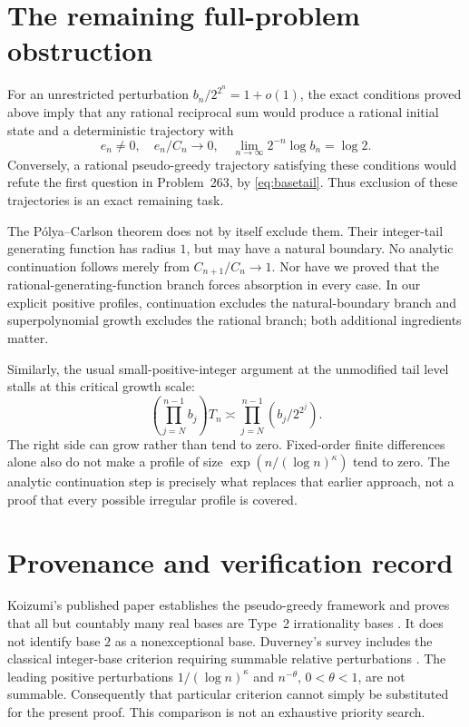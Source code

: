 \documentclass[11pt,a4paper]{article}
\theoremstyle{remark}\newtheorem{remark}[theorem]{Remark}
\begin{document}
\section{The remaining full-problem obstruction}
For an unrestricted perturbation $b_n/2^{2^n}=1+o(1)$, the exact conditions
proved above imply that any rational reciprocal sum would produce a
rational initial state and a deterministic trajectory with
\begin{equation}\label{eq:openbridge}
 \boxed{\qquad
 e_n\ne0,\quad e_n/C_n\longrightarrow0,\quad
 \lim_{n\to\infty}2^{-n}\log b_n=\log2.
 \qquad}
\end{equation}
Conversely, a rational pseudo-greedy trajectory satisfying these conditions
would refute the first question in Problem~263, by \eqref{eq:basetail}.
Thus exclusion of these trajectories is an exact remaining task.

The P\'olya--Carlson theorem does not by itself exclude them. Their
integer-tail generating function has radius $1$, but may have a natural
boundary. No analytic continuation follows merely from
$C_{n+1}/C_n\to1$. Nor have we proved that the rational-generating-function
branch forces absorption in every case. In our explicit positive profiles,
continuation excludes the natural-boundary branch and superpolynomial
growth excludes the rational branch; both additional ingredients matter.

Similarly, the usual small-positive-integer argument at the unmodified tail
level stalls at this critical growth scale:
\[
 \left(\prod_{j=N}^{n-1}b_j\right)T_n
 \asymp \prod_{j=N}^{n-1}(b_j/2^{2^j}).
\]
The right side can grow rather than tend to zero. Fixed-order finite
differences alone also do not make a profile of size
$\exp(n/(\log n)^\kappa)$ tend to zero. The analytic continuation step is
precisely what replaces that earlier approach, not a proof that every
possible irregular profile is covered.

\section{Provenance and verification record}
Koizumi's published paper establishes the pseudo-greedy framework and proves
that all but countably many real bases are Type~2 irrationality bases
\cite{koizumi}. It does not identify base $2$ as a nonexceptional base.
Duverney's survey includes the classical integer-base criterion requiring
summable relative perturbations \cite[Theorem~2.3]{duverney}.
The leading positive perturbations $1/(\log n)^\kappa$ and $n^{-\theta}$,
$0<\theta<1$, are not summable. Consequently that particular criterion
cannot simply be substituted for the present proof. This comparison is
not an exhaustive priority search.
\end{document}
